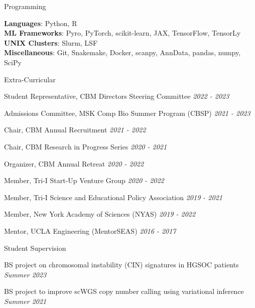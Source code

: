 \documentclass{resume} %
\begin{document}

\begin{rSection}{Programming}

\textbf{Languages}: Python, R \\
\textbf{ML Frameworks}: Pyro, PyTorch, scikit-learn, JAX, TensorFlow, TensorLy \\
\textbf{UNIX Clusters}: Slurm, LSF \\
\textbf{Miscellaneous}: Git, Snakemake, Docker, scanpy, AnnData, pandas, numpy, SciPy

\end{rSection}


\begin{rSection}{Extra-Curricular} \itemsep -3pt
\item Student Representative, CBM Directors Steering Committee \hfill {\em 2022 - 2023}
\item Admissions Committee, MSK Comp Bio Summer Program (CBSP) \hfill {\em 2021 - 2023}
\item Chair, CBM Annual Recruitment \hfill {\em 2021 - 2022}
\item Chair, CBM Research in Progress Series \hfill {\em 2020 - 2021}
\item Organizer, CBM Annual Retreat \hfill {\em 2020 - 2022}
\item Member, Tri-I Start-Up Venture Group \hfill {\em 2020 - 2022}
\item Member, Tri-I Science and Educational Policy Association \hfill {\em 2019 - 2021}
\item Member, New York Academy of Sciences (NYAS) \hfill {\em 2019 - 2022}
\item Mentor, UCLA Engineering (MentorSEAS) \hfill {\em 2016 - 2017}

\end{rSection}


\begin{rSection}{Student Supervision} \itemsep -3pt
\item BS project on chromosomal instability (CIN) signatures in HGSOC patients \hfill {\em Summer 2023}
\item BS project to improve scWGS copy number calling using variational inference \hfill {\em Summer 2021}

\end{rSection}
\end{document}
